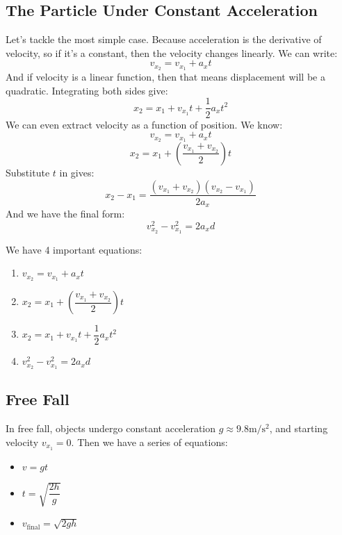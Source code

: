 \documentclass[12pt]{article}
\begin{document}
\subsection*{The Particle Under Constant Acceleration}
Let's tackle the most simple case. Because acceleration is the derivative of velocity, so if it's a constant, then the velocity changes linearly. We can write:
\begin{equation}
    v_{x_2} = v_{x_1} + a_x t 
\end{equation}
And if velocity is a linear function, then that means displacement will be a quadratic. Integrating both sides give:
\begin{equation}
    x_2 = x_1 + v_{x_1} t + \dfrac{1}{2}a_x t^2
\end{equation}
We can even extract velocity as a function of position. We know:
\begin{equation*}
    v_{x_2} = v_{x_1} + a_x t 
\end{equation*}
\begin{equation*}
    x_2 = x_1 + \left( \dfrac{v_{x_1} + v_{x_2}}{2}\right) t
\end{equation*}
Substitute $t$ in gives:
\begin{equation*}
    x_2 - x_1 =  \dfrac{(v_{x_1} + v_{x_2})(v_{x_2} - v_{x_1})}{2a_x}
\end{equation*}
And we have the final form:
\begin{equation*}
    v_{x_2}^2 - v_{x_1}^2 = 2a_x d 
\end{equation*}
\begin{insight}
We have 4 important equations:
    \begin{enumerate}
        \item $v_{x_2} = v_{x_1} + a_x t$
        \item $x_2 = x_1 + \left( \dfrac{v_{x_1} + v_{x_2}}{2}\right) t$
        \item $x_2 = x_1 + v_{x_1} t + \dfrac{1}{2}a_x t^2$
        \item $v_{x_2}^2 - v_{x_1}^2 = 2a_x d$
    \end{enumerate}
\end{insight}
\subsection*{Free Fall}
In free fall, objects undergo constant acceleration $g \approx 9.8 \mathrm{m/s^2}$, and starting velocity $v_{x_1} = 0$. Then we have a series of equations:
\begin{itemize}
    \item $v = gt$
    \item $t = \sqrt{\dfrac{2h}{g}}$
    \item $v_{\text{final}} = \sqrt{2gh}$
\end{itemize}
\end{document}
